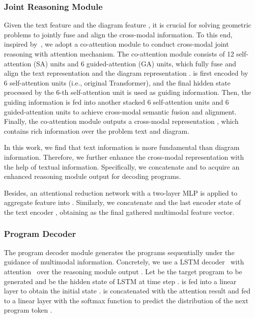 \documentclass[11pt,a4paper]{article}
\begin{document}
\subsubsection{Joint Reasoning Module}
Given the text feature  and the diagram feature , it is crucial for solving geometric problems to jointly fuse and align the cross-modal information.
To this end, inspired by~\citet{yu2019deep}, we adopt a co-attention module to conduct cross-modal joint reasoning with attention mechanism.  
The co-attention module consists of 12 self-attention (SA) units and 6 guided-attention (GA) units, which fully fuse and align the text representation  and the diagram representation . 
 is first encoded by 6 self-attention units (i.e., original Transformer), and the final hidden state processed by the 6-th self-attention unit is used as guiding information. 
Then, the guiding information is fed into another stacked 6 self-attention units and 6 guided-attention units to achieve cross-modal semantic fusion and alignment.
Finally, the co-attention module outputs a cross-modal representation , which contains rich information over the problem text and diagram. 

In this work, we find that text information is more fundamental than diagram information. Therefore, we further enhance the cross-modal representation with the help of textual information. Specifically, we concatenate  and  to acquire an enhanced reasoning module output  for decoding programs.


Besides, an attentional reduction network with a two-layer MLP is applied to aggregate feature  
into .
Similarly, we concatenate  and the last encoder state of the text encoder , obtaining  as the final gathered multimodal feature vector.


\subsubsection{Program Decoder}


The program decoder module generates the programs sequentially under the guidance of multimodal information. Concretely, we use a LSTM decoder~\cite{LSTM} with attention~\cite{bahdanau2014neural} over the reasoning module output  . Let  be the target program to be generated and  be the hidden state of LSTM at time step .  is fed into a linear layer to obtain the initial state .  is concatenated with the attention result and fed to a linear layer with the softmax function to predict the distribution of the next program token .
\end{document}

